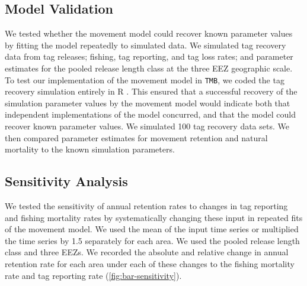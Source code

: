 \documentclass{article}
\begin{document}
\subsection{Model Validation}
We tested whether the movement model could recover known parameter values by fitting the model repeatedly to simulated data. We simulated tag recovery data from tag releases; fishing, tag reporting, and tag loss rates; and parameter estimates for the pooled release length class at the three EEZ geographic scale. To test our implementation of the movement model in \texttt{TMB}, we coded the tag recovery simulation entirely in R \cite[][]{r2020}. This ensured that a successful recovery of the simulation parameter values by the movement model would indicate both that independent implementations of the model concurred, and that the model could recover known parameter values. We simulated 100 tag recovery data sets. We then compared parameter estimates for movement retention and natural mortality to the known simulation parameters.

\subsection{Sensitivity Analysis}
We tested the sensitivity of annual retention rates to changes in tag reporting and fishing mortality rates by systematically changing these input in repeated fits of the movement model. We used the mean of the input time series or multiplied the time series by \num{1.5} separately for each area. We used the pooled release length class and three EEZs. We recorded the absolute and relative change in annual retention rate for each area under each of these changes to the fishing mortality rate and tag reporting rate (\autoref{fig:bar-sensitivity}).
\end{document}
